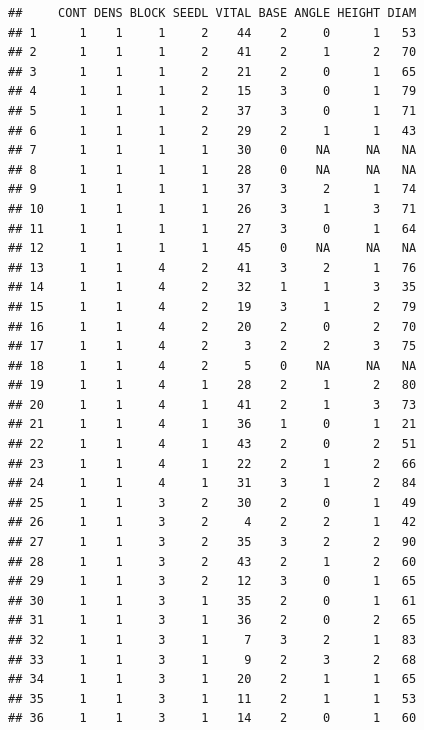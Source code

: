 \documentclass[krantz2,ChapterTOCs]{krantz}\usepackage{knitr}
\begin{document}
\begin{knitrout}\footnotesize
{}\color{fgcolor}\begin{kframe}
\begin{alltt}
 \hlkwb{<-} \hlstd{(} \hlstd{=} \hlstd{)}
\end{alltt}
\begin{verbatim}
##     CONT DENS BLOCK SEEDL VITAL BASE ANGLE HEIGHT DIAM
## 1      1    1     1     2    44    2     0      1   53
## 2      1    1     1     2    41    2     1      2   70
## 3      1    1     1     2    21    2     0      1   65
## 4      1    1     1     2    15    3     0      1   79
## 5      1    1     1     2    37    3     0      1   71
## 6      1    1     1     2    29    2     1      1   43
## 7      1    1     1     1    30    0    NA     NA   NA
## 8      1    1     1     1    28    0    NA     NA   NA
## 9      1    1     1     1    37    3     2      1   74
## 10     1    1     1     1    26    3     1      3   71
## 11     1    1     1     1    27    3     0      1   64
## 12     1    1     1     1    45    0    NA     NA   NA
## 13     1    1     4     2    41    3     2      1   76
## 14     1    1     4     2    32    1     1      3   35
## 15     1    1     4     2    19    3     1      2   79
## 16     1    1     4     2    20    2     0      2   70
## 17     1    1     4     2     3    2     2      3   75
## 18     1    1     4     2     5    0    NA     NA   NA
## 19     1    1     4     1    28    2     1      2   80
## 20     1    1     4     1    41    2     1      3   73
## 21     1    1     4     1    36    1     0      1   21
## 22     1    1     4     1    43    2     0      2   51
## 23     1    1     4     1    22    2     1      2   66
## 24     1    1     4     1    31    3     1      2   84
## 25     1    1     3     2    30    2     0      1   49
## 26     1    1     3     2     4    2     2      1   42
## 27     1    1     3     2    35    3     2      2   90
## 28     1    1     3     2    43    2     1      2   60
## 29     1    1     3     2    12    3     0      1   65
## 30     1    1     3     1    35    2     0      1   61
## 31     1    1     3     1    36    2     0      2   65
## 32     1    1     3     1     7    3     2      1   83
## 33     1    1     3     1     9    2     3      2   68
## 34     1    1     3     1    20    2     1      1   65
## 35     1    1     3     1    11    2     1      1   53
## 36     1    1     3     1    14    2     0      1   60

\end{verbatim}
\end{kframe}
\end{knitrout}
\end{document}
